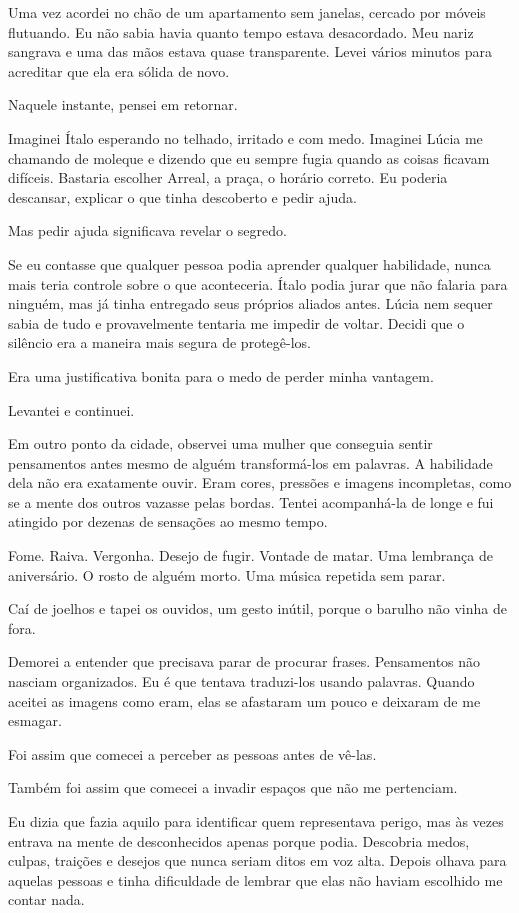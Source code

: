 Uma vez acordei no chão de um apartamento sem janelas, cercado por móveis flutuando. Eu não sabia havia quanto tempo estava desacordado. Meu nariz sangrava e uma das mãos estava quase transparente. Levei vários minutos para acreditar que ela era sólida de novo.

Naquele instante, pensei em retornar.

Imaginei Ítalo esperando no telhado, irritado e com medo. Imaginei Lúcia me chamando de moleque e dizendo que eu sempre fugia quando as coisas ficavam difíceis. Bastaria escolher Arreal, a praça, o horário correto. Eu poderia descansar, explicar o que tinha descoberto e pedir ajuda.

Mas pedir ajuda significava revelar o segredo.

Se eu contasse que qualquer pessoa podia aprender qualquer habilidade, nunca mais teria controle sobre o que aconteceria. Ítalo podia jurar que não falaria para ninguém, mas já tinha entregado seus próprios aliados antes. Lúcia nem sequer sabia de tudo e provavelmente tentaria me impedir de voltar. Decidi que o silêncio era a maneira mais segura de protegê-los.

Era uma justificativa bonita para o medo de perder minha vantagem.

Levantei e continuei.

Em outro ponto da cidade, observei uma mulher que conseguia sentir pensamentos antes mesmo de alguém transformá-los em palavras. A habilidade dela não era exatamente ouvir. Eram cores, pressões e imagens incompletas, como se a mente dos outros vazasse pelas bordas. Tentei acompanhá-la de longe e fui atingido por dezenas de sensações ao mesmo tempo.

Fome. Raiva. Vergonha. Desejo de fugir. Vontade de matar. Uma lembrança de aniversário. O rosto de alguém morto. Uma música repetida sem parar.

Caí de joelhos e tapei os ouvidos, um gesto inútil, porque o barulho não vinha de fora.

Demorei a entender que precisava parar de procurar frases. Pensamentos não nasciam organizados. Eu é que tentava traduzi-los usando palavras. Quando aceitei as imagens como eram, elas se afastaram um pouco e deixaram de me esmagar.

Foi assim que comecei a perceber as pessoas antes de vê-las.

Também foi assim que comecei a invadir espaços que não me pertenciam.

Eu dizia que fazia aquilo para identificar quem representava perigo, mas às vezes entrava na mente de desconhecidos apenas porque podia. Descobria medos, culpas, traições e desejos que nunca seriam ditos em voz alta. Depois olhava para aquelas pessoas e tinha dificuldade de lembrar que elas não haviam escolhido me contar nada.

